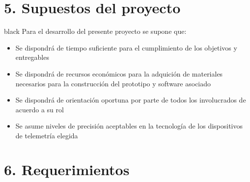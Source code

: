 \documentclass[
11pt, %
codirector, %
]{charter}
\begin{document}
\section{5. Supuestos del proyecto}
\label{sec:supuestos}

\begin{consigna}{black}
Para el desarrollo del presente proyecto se supone que: 

\begin{itemize}
	\item Se dispondrá de tiempo suficiente para el cumplimiento de los objetivos y entregables
	\item Se dispondrá de recursos económicos para la adquición de materiales necesarios para la construcción del prototipo y software asociado
	\item Se dispondrá de orientación oportuna por parte de todos los involucrados de acuerdo a su rol
	\item Se asume niveles de precisión aceptables en la tecnología de los dispositivos de telemetría elegida
\end{itemize}

\end{consigna}

\section{6. Requerimientos}
\label{sec:requerimientos}
\end{document}
